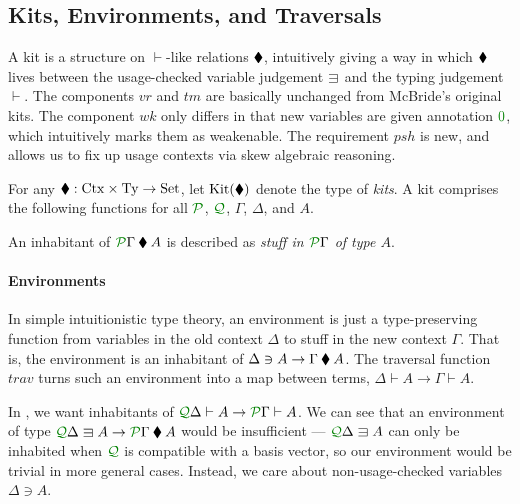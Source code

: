 \documentclass[submission,copyright,creativecommons]{eptcs}
\begin{document}
\subsection{Kits, Environments, and Traversals}

A kit is a structure on $\vdash$-like relations $\mathbin{\blacklozenge}$, intuitively
giving a way in which $\mathbin{\blacklozenge}$ lives between the usage-checked variable
judgement $\lvar$ and the typing judgement $\vdash$.
The components $\mathit{vr}$ and $\mathit{tm}$ are basically unchanged from
McBride's original kits.
The component $\mathit{wk}$ only differs in that new variables are given
annotation $\rescomment 0$, which intuitively marks them as weakenable.
The requirement $\mathit{psh}$ is new, and allows us to fix up usage contexts
via skew algebraic reasoning.

\begin{definition}\label{def:kit}
  For any $\mathbin{\blacklozenge} : \mathrm{Ctx} \times \mathrm{Ty} \to \mathrm{Set}$, let
  $\operatorname{Kit}(\mathbin{\blacklozenge})$ denote the type of \emph{kits}.
  A kit comprises the following functions for all $\resctx P$, $\resctx Q$,
  $\Gamma$, $\Delta$, and $A$.
\end{definition}

An inhabitant of $\ctx{\Gamma}{P} \kitrel A$ is described as
\emph{stuff in $\ctx{\Gamma}{P}$ of type $A$}.

\paragraph{Environments} In simple intuitionistic type theory, an
environment is just a type-preserving function from variables in the
old context $\Delta$ to stuff in the new context $\Gamma$.  That is,
the environment is an inhabitant of
$\Delta \ni A \to \Gamma \mathbin{\blacklozenge} A$.  The traversal function
$\mathit{trav}$ turns such an environment into a map between terms,
$\Delta \vdash A \to \Gamma \vdash A$.

In \name{}, we want inhabitants of
$\ctx{\Delta}{Q} \vdash A \to \ctx{\Gamma}{P} \vdash A$.
We can see that an environment of type
$\ctx{\Delta}{Q} \lvar A \to \ctx{\Gamma}{P} \kitrel A$ would
be insufficient --- $\ctx{\Delta}{Q} \lvar A$ can only be inhabited when
$\resctx Q$ is compatible with a basis vector, so our environment would be
trivial in more general cases.
Instead, we care about non-usage-checked variables $\Delta \ni A$.
\end{document}
